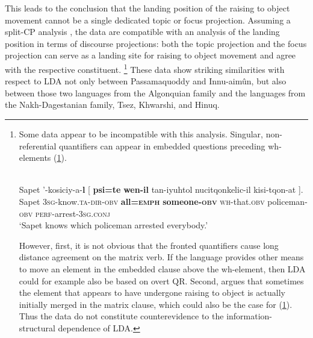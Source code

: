 \documentclass[output=paper
,modfonts
,nonflat]{langsci/langscibook}
\begin{document}
This leads \citet{Bruening2001a} to the conclusion that the landing position of the raising to object movement cannot be a single dedicated topic or focus projection. Assuming a split-CP analysis \citep{Rizzi1997}, the data are compatible with an analysis of the landing position in terms of discourse projections: both the topic projection and the focus projection can serve as a landing site for raising to object movement and agree with the respective constituent. \footnote{Some data appear to be incompatible with this analysis. Singular, non-referential quantifiers can appear in embedded questions preceding wh-elements (\ref{ex:passam_qr}).
\begin{exe}
\label{ex:passam_qr}\\ %
	\gll Sapet '-kosiciy-a-\textbf{l} [ \textbf{psi=te} \textbf{wen-il} tan-iyuhtol nucitqonkelic-il kisi-tqon-at ].\\
		 Sapet \textsc{3sg}-know.\textsc{ta-dir-obv} {} \textbf{all=\textsc{emph}} \textbf{someone-\textsc{obv}}  \textsc{wh}-that.\textsc{obv} policeman-\textsc{obv} \textsc{perf}-arrest-\textsc{3sg.conj}\\
	\glt `Sapet knows which policeman arrested everybody.'
\end{exe}
However, first, it is not obvious that the fronted quantifiers cause long distance agreement on the matrix verb. If the language provides other means to move an element in the embedded clause above the wh-element, then LDA could for example also be based on overt QR. Second, \citet{Bruening2001a} argues that sometimes the element that appears to have undergone raising to object is actually initially merged in the matrix clause, which could also be the case for (\ref{ex:passam_qr}). Thus the data do not constitute counterevidence to the information-structural dependence of LDA.} These data show striking similarities with respect to LDA not only between Passamaquoddy and Innu-aim\^{u}n, but also between those two languages from the Algonquian family and the languages from the Nakh-Dagestanian family, Tsez, Khwarshi, and Hinuq.
\end{document}
